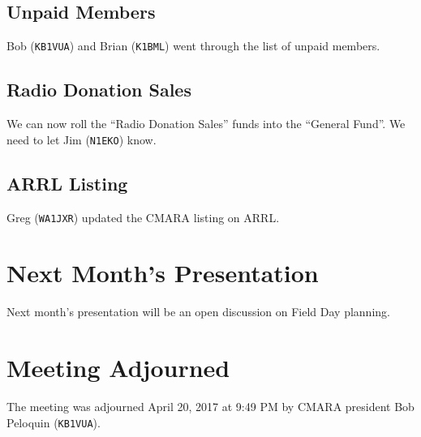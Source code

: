 \documentclass[10pt,letterpaper]{article}
\begin{document}
\subsection{Unpaid Members}
Bob (\texttt{KB1VUA}) and Brian (\texttt{K1BML}) went through the list of unpaid members.

\subsection{Radio Donation Sales}
We can now roll the ``Radio Donation Sales'' funds into the ``General Fund''. We need to let Jim (\texttt{N1EKO}) know.

\subsection{ARRL Listing}
Greg (\texttt{WA1JXR}) updated the CMARA listing on ARRL.

\section{Next Month's Presentation}
Next month's presentation will be an open discussion on Field Day planning.

\section{Meeting Adjourned}
The meeting was adjourned April 20, 2017 at 9:49 PM by CMARA president Bob Peloquin (\texttt{KB1VUA}).
\end{document}
